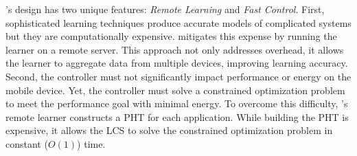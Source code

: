
\SYSTEM{}'s design has two unique features: \textit{Remote Learning} and \textit{Fast Control}. First, sophisticated learning techniques
  produce accurate models of complicated systems but they are
  computationally expensive.  \SYSTEM{} mitigates this expense by
  running the learner on a remote server. This approach not only
  addresses overhead, it allows the learner to aggregate data from
  multiple devices, improving learning accuracy. Second, the controller must not significantly
  impact performance or energy on the mobile device.  Yet, the
  controller must solve a constrained optimization problem to meet the
  performance goal with minimal energy.  To overcome this difficulty,
  \SYSTEM{}'s remote learner constructs a PHT for each application.
  While building the PHT is expensive, it allows the LCS to solve the
  constrained optimization problem in constant ($O(1)$) time.

